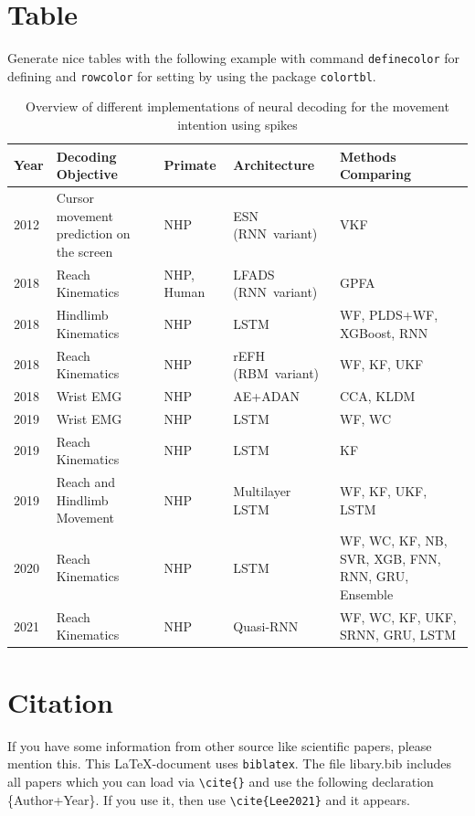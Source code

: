 \section{Table}
Generate nice tables with the following example with command \verb+definecolor+ for defining and \verb+rowcolor+ for setting by using the package \verb+colortbl+.
\begin{table}[ht]    \centering
    \caption{Overview of different implementations of neural decoding for the movement intention using spikes}
    \begin{tabular}{lm{4cm}lm{3cm}m{3cm}} \hline 
        \textbf{Year}   & \textbf{Decoding Objective} & \textbf{Primate} & \textbf{Architecture} & \textbf{Methods Comparing} \\ \hline\hline 
        \rowcolor{lavender}
        2012   & Cursor movement prediction on the screen & NHP & ESN (RNN~variant) & VKF \\
        2018 & Reach Kinematics & NHP, Human & LFADS (RNN~variant) & GPFA \\ 
        \rowcolor{lavender}
        2018        & Hindlimb Kinematics & NHP & LSTM  & WF, PLDS+WF, XGBoost, RNN \\ 
        2018      & Reach Kinematics & NHP & rEFH (RBM~variant) & WF, KF, UKF \\
        \rowcolor{lavender}
        2018  & Wrist EMG & NHP &  AE+ADAN & CCA, KLDM \\
        2019      & Wrist EMG & NHP & LSTM  & WF, WC\\  
        \rowcolor{lavender}
        2019        & Reach Kinematics& NHP & LSTM & KF\\ 
        2019      & Reach and Hindlimb Movement & NHP & Multilayer LSTM  & WF, KF, UKF, LSTM\\ 
        \rowcolor{lavender}
        2020     & Reach Kinematics & NHP & LSTM  & WF, WC, KF, NB, SVR, XGB, FNN, RNN, GRU, Ensemble\\ 
        2021     & Reach Kinematics & NHP & Quasi-RNN  & WF, WC, KF, UKF, SRNN, GRU, LSTM  
        \\ \hline
    \end{tabular} 
    \label{tab:ND}
\end{table}
\section{Citation}
If you have some information from other source like scientific papers, please mention this. This \LaTeX-document uses \verb+biblatex+. The file libary.bib includes all papers which you can load via \verb+\cite{}+ and use the following declaration \{Author+Year\}. If you use it, then use \verb+\cite{Lee2021}+ and it appears.
\newpage
